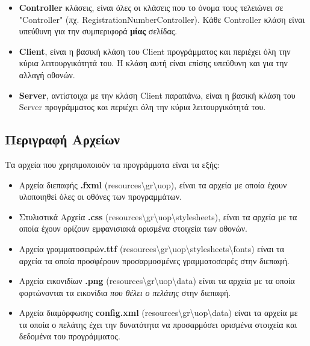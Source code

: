 \begin{itemize}
            \item \textbf{Controller} κλάσεις, είναι όλες οι κλάσεις που το όνομα τους τελειώνει σε "Controller" (πχ. RegistrationNumberController). Κάθε Controller κλάση είναι υπεύθυνη για την συμπεριφορά \textbf{μίας} σελίδας.
            
            \item \textbf{Client}, είναι η βασική κλάση του Client προγράμματος και περιέχει όλη την κύρια λειτουργικότητά του. Η κλάση αυτή είναι επίσης υπεύθυνη και για την αλλαγή οθονών.
            
            \item \textbf{Server}, αντίστοιχα με την κλάση Client παραπάνω, είναι η βασική κλάση του Server προγράμματος και περιέχει όλη την κύρια λειτουργικότητά του.
        \end{itemize}
        \newpage
        
        \subsection{Περιγραφή Αρχείων}
        \label{sec:SectionName1.3.3}
        Τα αρχεία που χρησιμοποιούν τα προγράμματα είναι τα εξής:
        \begin{itemize}
            \item Αρχεία διεπαφής \textbf{.fxml} (resources\textbackslash gr\textbackslash uop), είναι τα αρχεία με οποία έχουν υλοποιηθεί όλες οι οθόνες των προγραμμάτων.
            
            \item Στυλιστικά Αρχεία \textbf{.css} (resources\textbackslash gr\textbackslash uop\textbackslash stylesheets), είναι τα αρχεία με τα οποία έχουν ορίζουν εμφανισιακά ορισμένα στοιχεία των οθονών.
            
            \item Αρχεία γραμματοσειρών\textbf{.ttf} (resources\textbackslash gr\textbackslash uop\textbackslash stylesheets\textbackslash fonts) είναι τα αρχεία τα οποία προσφέρουν προσαρμοσμένες γραμματοσειρές στην διεπαφή.
            
            \item Αρχεία εικονιδίων \textbf{.png} (resources\textbackslash gr\textbackslash uop\textbackslash data) είναι τα αρχεία με τα οποία φορτώνονται τα εικονίδια \textit{που θέλει ο πελάτης} στην διεπαφή.
            
            \item Αρχεία διαμόρφωσης \textbf{config.xml} (resources\textbackslash gr\textbackslash uop\textbackslash data) είναι τα αρχεία με τα οποία ο πελάτης έχει την δυνατότητα να προσαρμόσει ορισμένα στοιχεία και δεδομένα του προγράμματος.
        \end{itemize}

